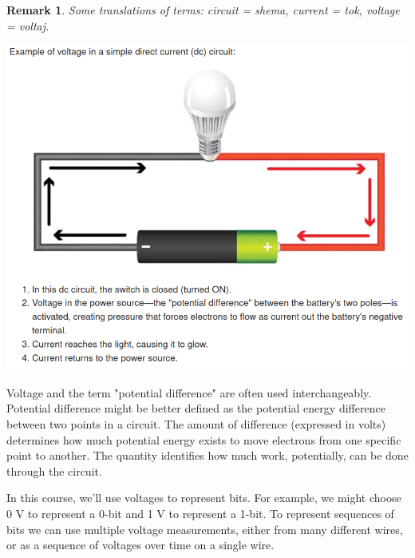\documentclass[a4paper,twoside]{article}
\newtheorem{remark}[theorem]{Remark}
\numberwithin{equation}{section}
\begin{document}
\begin{remark}
    Some translations of terms: circuit = shema, current = tok, voltage = voltaj.
\end{remark}
\begin{center}
    \includegraphics[scale=0.4]{assets/example_voltage.png}
\end{center}
Voltage and the term "potential difference" are often used interchangeably. Potential difference might
be better defined as the potential energy difference between two points in a circuit. The amount of
difference (expressed in volts) determines how much potential energy exists to move electrons from one
specific point to another. The quantity identifies how much work, potentially, can be done through the
circuit. \newline

In this course, we'll use voltages to represent bits. For example, we might choose 0 V to represent
a 0-bit and 1 V to represent a 1-bit. To represent sequences of bits we can use multiple voltage
measurements, either from many different wires, or as a sequence of voltages over time on a single wire.
\end{document}
